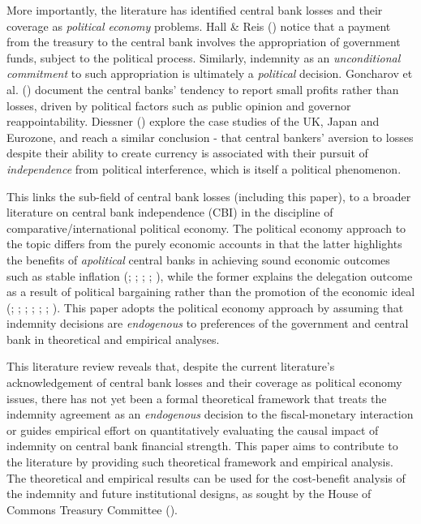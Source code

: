 \documentclass[
  a4paper,
  abstract=true]{scrartcl}
\theoremstyle{definition}
\begin{document}
More importantly, the literature has identified central bank losses and
their coverage as \emph{political economy} problems. Hall \& Reis
() notice that a payment from the treasury
to the central bank involves the appropriation of government funds,
subject to the political process. Similarly, indemnity as an
\emph{unconditional commitment} to such appropriation is ultimately a
\emph{political} decision. Goncharov et al.
() document the central banks'
tendency to report small profits rather than losses, driven by political
factors such as public opinion and governor reappointability. Diessner
() explore the case studies of the UK,
Japan and Eurozone, and reach a similar conclusion - that central
bankers' aversion to losses despite their ability to create currency is
associated with their pursuit of \emph{independence} from political
interference, which is itself a political phenomenon.

This links the sub-field of central bank losses (including this paper),
to a broader literature on central bank independence (CBI) in the
discipline of comparative/international political economy. The political
economy approach to the topic differs from the purely economic accounts
in that the latter highlights the benefits of \emph{apolitical} central
banks in achieving sound economic outcomes such as stable inflation
(;
;
;
;
), while the former explains the
delegation outcome as a result of political bargaining rather than the
promotion of the economic ideal (; ;
;
;
;
;
). This paper adopts the
political economy approach by assuming that indemnity decisions are
\emph{endogenous} to preferences of the government and central bank in
theoretical and empirical analyses.

This literature review reveals that, despite the current literature's
acknowledgement of central bank losses and their coverage as political
economy issues, there has not yet been a formal theoretical framework
that treats the indemnity agreement as an \emph{endogenous} decision to
the fiscal-monetary interaction or guides empirical effort on
quantitatively evaluating the causal impact of indemnity on central bank
financial strength. This paper aims to contribute to the literature by
providing such theoretical framework and empirical analysis. The
theoretical and empirical results can be used for the cost-benefit
analysis of the indemnity and future institutional designs, as sought by
the House of Commons Treasury Committee ().
\end{document}

